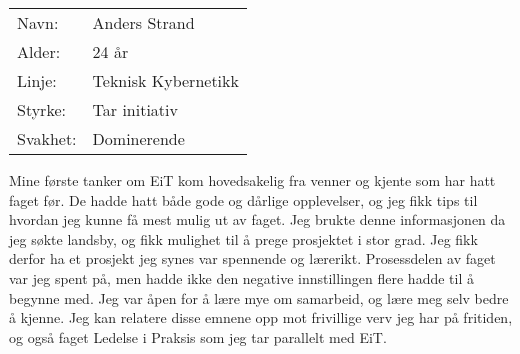 \begin{table}[H]
\begin{tabular}{l l}
        Navn: & Anders Strand \\
        Alder: & 24 år \\ 
        Linje: & Teknisk Kybernetikk \\
        Styrke: & Tar initiativ \\
        Svakhet: & Dominerende
    \end{tabular}
\end{table}

Mine første tanker om EiT kom hovedsakelig fra venner og kjente som har hatt faget før.
De hadde hatt både gode og dårlige opplevelser, og jeg fikk tips til hvordan jeg kunne få mest mulig ut av faget. 
Jeg brukte denne informasjonen da jeg søkte landsby, og fikk mulighet til å prege prosjektet i stor grad. 
Jeg fikk derfor ha et prosjekt jeg synes var spennende og lærerikt.
Prosessdelen av faget var jeg spent på, men hadde ikke den negative innstillingen flere hadde til å begynne med. 
Jeg var åpen for å lære mye om samarbeid, og lære meg selv bedre å kjenne. 
Jeg kan relatere disse emnene opp mot frivillige verv jeg har på fritiden, og også faget Ledelse i Praksis som jeg tar parallelt med EiT.
